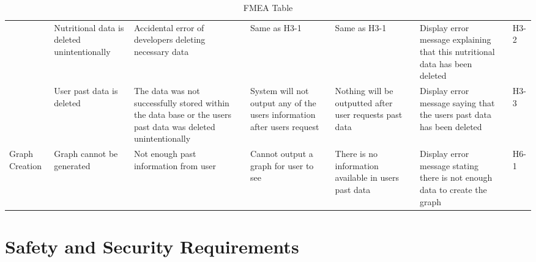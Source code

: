 \documentclass{article}
\begin{document}
\begin{landscape}
\begin{table}[ht]
{\begin{tabular}{|p{2cm}|p{3cm}|p{3cm}|p{3cm}|p{3cm}|p{2cm}|p{3cm}|p{1cm}|p{1cm}|}
		& Nutritional data is deleted unintentionally & Accidental error of developers deleting necessary data & Same as H3-1 & Same as H3-1 & & Display error message explaining that this nutritional data has been deleted & & H3-2\\ \cline{2-9}
		& User past data is deleted & The data was not successfully stored within the data base or the users past data was deleted unintentionally & System will not output any of the users information after users request  & Nothing will be outputted after user requests past data  & & Display error message saying that the users past data has been deleted  & & H3-3\\ \hline
		Graph Creation & Graph cannot be generated  & Not enough past information from user  & Cannot output a graph for user to see & There is no information available in users past data  & & Display error message stating there is not enough data to create the graph & & H6-1 \\ \cline{2-9}
		
		

	\end{tabular}
}

	\caption{FMEA Table}
	\label{tab:my_label}
\end{table}
\end{landscape}

\section{Safety and Security Requirements}
\end{document}
